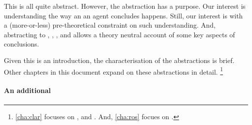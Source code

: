 \begin{note}
  This is all quite abstract.
  However, the abstraction has a purpose.
  Our interest is understanding the way an  an agent concludes happens.
  Still, our interest is with a (more-or-less) pre-theoretical constraint on such understanding.
  And, abstracting to , , , and  allows a theory neutral account of some key aspects of conclusions.

  Given this is an introduction, the characterisation of the abstractions is brief.
  Other chapters in this document expand on these abstractions in detail.%
  \footnote{
    \autoref{cha:clar} focuses on ,  and .
    And, \autoref{cha:ros} focues on .
  }
\end{note}



\paragraph*{An additional }


